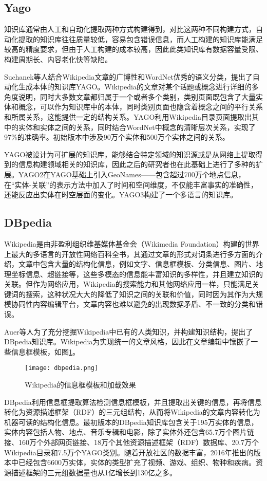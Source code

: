 \subsection{Yago}
知识库通常由人工和自动化提取两种方式构建得到，对比这两种不同构建方式，自动化提取的知识库往往质量较低，容易包含错误信息，而人工构建的知识库能满足较高的精度要求，但由于人工构建的成本较高，因此此类知识库有数据容量受限、构建周期长、内容老化快等缺陷。

Suchanek等人结合Wikipedia文章的广博性和WordNet优秀的语义分类，提出了自动化生成本体的知识库YAGO。Wikipedia的文章对某个话题或概念进行详细的多角度说明，同时大多数文章都归属于一个或者多个类别，类别页面既包含了大量实体和概念，可以作为知识库中的本体，同时类别页面也隐含着概念之间的平行关系和所属关系，这能提供一定的结构关系。YAGO利用Wikipedia目录页面提取出其中的实体和实体之间的关系，同时结合WordNet中概念的清晰层次关系，实现了97\%的准确率。初始版本中涉及90万个实体和500万个实体之间的关系。

YAGO被设计为可扩展的知识库，能够结合特定领域的知识源或是从网络上提取得到的信息构建领域相关的知识库，因此之后的研究者也在此基础上进行了多种的扩展。YAGO2在YAGO基础上引入GeoNames——包含超过700万个地点信息，在“实体-关联”的表示方法中加入了时间和空间维度，不仅能丰富事实的准确性，还能反应出实体在时空层面的变化。YAGO3构建了一个多语言的知识库。

\subsection{DBpedia}
Wikipedia是由非盈利组织维基媒体基金会（Wikimedia Foundation）构建的世界上最大的多语言的开放性网络百科全书，其通过文章的形式对词条进行多方面的介绍，文章中包含大量的结构化信息，例如文字、信息框模板、分类信息、图片、地理坐标信息、超链接等，这些多模态的信息能丰富知识的多样性，并且建立知识的关联。但作为网络应用，Wikipedia的搜索能力和其他网络应用一样，只能满足关键词的搜索，这种状况大大的降低了知识之间的关联和价值，同时因为其作为大规模协同性内容编辑平台，文章内容也难以避免的出现数据矛盾、不一致的分类和错误。

Auer等人为了充分挖掘Wikipedia中已有的人类知识，并构建知识结构，提出了DBpedia知识库。Wikipedia为实现统一的文章风格，因此在文章编辑中镶嵌了一些信息框模板，如图\ref{dbpedia}。
\begin{figure}[h]
	\centering
	\texttt{[image: dbpedia.png]}
	\caption{Wikipedia的信息框模板和加载效果}
	\label{dbpedia}
\end{figure}
DBpedia利用信息框提取算法检测信息框模板，并且提取出关键的信息，再将信息转化为资源描述框架（RDF）的三元组结构，从而将Wikipedia的文章内容转化为机器可读的结构化信息。最初版本的DBpedia知识库包含关于195万实体的信息，实体内容包括人物、地点、音乐专辑和电影，除了实体外还包含65.7万个图片链接、160万个外部网页链接、18万个其他资源描述框架（RDF）数据库、20.7万个Wikipedia目录和7.5万个YAGO类别。随着开放社区的数据丰富，2016年推出的版本中已经包含6600万实体，实体的类型扩充了视频、游戏、组织、物种和疾病。资源描述框架的三元组数据量也从1亿增长到130亿之多。

